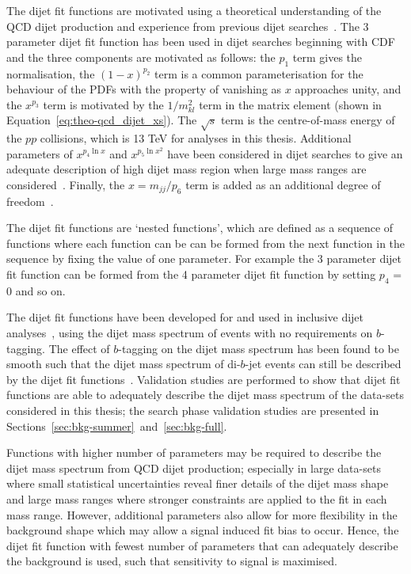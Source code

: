 The dijet fit functions are motivated using a theoretical understanding of the QCD dijet production
and experience from previous dijet searches~\cite{theo-dijet_harris}.
The 3 parameter dijet fit function has been used in dijet searches beginning with CDF~\cite{dijet-CDF_3par}
and the three components are motivated as follows:
the $p_1$ term gives the normalisation,
the $(1-x)^{p_2}$ term is a common parameterisation for the behaviour of the PDFs with the property of vanishing as $x$ approaches unity,
and the $x^{p_3}$ term is motivated by the $1/m_{kl}^2$ term in the matrix element (shown in Equation~\ref{eq:theo-qcd_dijet_xs}).
The $\sqrt{s}$ term is the centre-of-mass energy of the $pp$ collisions, which is 13 TeV for analyses in this thesis.
Additional parameters of $x^{p_4\ln{x}}$ and $x^{p_5\ln{x}^{2}}$ have been considered in dijet searches to give an adequate description of
high dijet mass region when large mass ranges are considered~\cite{dijet-mori16_paper,dijet-CDF_4par}.
Finally, the $x=m_{jj}/p_6$ term is added as an additional degree of freedom~\cite{det-thesis_kate}.

The dijet fit functions are `nested functions',
which are defined as a sequence of functions where each function can be can be formed from the next function in the sequence by fixing the value of one parameter.
For example the 3 parameter dijet fit function can be formed from the 4 parameter dijet fit function by setting $p_4$ = 0 and so on.

The dijet fit functions have been developed for and used in inclusive dijet analyses~\cite{theo-dijet_harris},
using the dijet mass spectrum of events with no requirements on $b$-tagging.
The effect of $b$-tagging on the dijet mass spectrum has been found to be smooth
such that the dijet mass spectrum of di-$b$-jet events can still be described by the dijet fit functions~\cite{dibjet-mori16_paper}.
Validation studies are performed to show that dijet fit functions are able
to adequately describe the dijet mass spectrum of the data-sets considered in this thesis;
the search phase validation studies are presented in Sections~\ref{sec:bkg-summer}~and~\ref{sec:bkg-full}.

Functions with higher number of parameters may be required to describe the dijet mass spectrum from QCD dijet production;
especially in large data-sets where small statistical uncertainties reveal finer details of the dijet mass shape
and large mass ranges where stronger constraints are applied to the fit in each mass range.
However, additional parameters also allow for more flexibility in the background shape
which may allow a signal induced fit bias to occur.
Hence, the dijet fit function with fewest number of parameters
that can adequately describe the background is used, such that sensitivity to signal is maximised.


